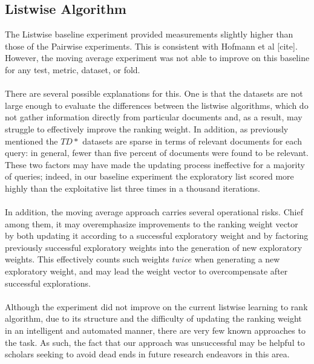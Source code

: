 \documentclass{acm_proc_article-sp}
\begin{document}
\subsection{Listwise Algorithm}
The Listwise baseline experiment provided measurements slightly higher than those of the Pairwise experiments.  This is consistent with Hofmann et al [cite].  However, the moving average experiment was not able to improve on this baseline for any test, metric, dataset, or fold.  \\ \\
There are several possible explanations for this.  One is that the datasets are not large enough to evaluate the differences between the listwise algorithms, which do not gather information directly from particular documents and, as a result, may struggle to effectively improve the ranking weight.  In addition, as previously mentioned the $TD*$ datasets are sparse in terms of relevant documents for each query: in general, fewer than five percent of documents were found to be relevant.  These two factors may have made the updating process ineffective for a majority of queries; indeed, in our baseline experiment the exploratory list scored more highly than the exploitative list three times in a thousand iterations. \\ \\
In addition, the moving average approach carries several operational risks.  Chief among them, it may overemphasize improvements to the ranking weight vector by both updating it according to a successful exploratory weight and by factoring previously successful exploratory weights into the generation of new exploratory weights.  This effectively counts such weights $twice$ when generating a new exploratory weight, and may lead the weight vector to overcompensate after successful explorations.  \\ \\
Although the experiment did not improve on the current listwise learning to rank algorithm, due to its structure and the difficulty of updating the ranking weight in an intelligent and automated manner, there are very few known approaches to the task.  As such, the fact that our approach was unsuccessful may be helpful to scholars seeking to avoid dead ends in future research endeavors in this area. 
\end{document}
